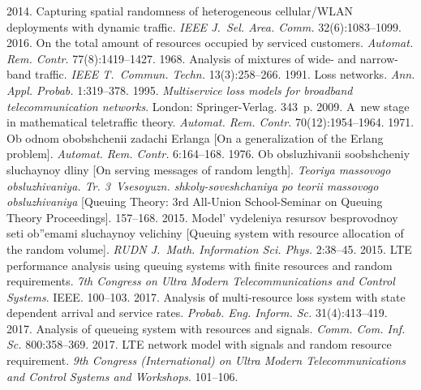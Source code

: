 \begin{multicols}{2}
{{\begin{thebibliography}{99}
 2014. Capturing spatial randomness of heterogeneous 
cellular/WLAN deployments with dynamic traffic. 
\textit{IEEE J.~Sel. Area. Comm.} 32(6):1083--1099.
 2016. 
On the total 
amount of resources occupied by serviced customers. 
\textit{Automat. Rem. Contr.} 77(8):1419--1427.
 1968. Analysis of 
mixtures of wide- and narrow-band traffic. 
\textit{IEEE T.~Commun. Techn.} 13(3):258--266.
 1991. Loss networks. \textit{Ann. Appl. Probab.} 1:319--378.
 1995. \textit{Multiservice loss models for broadband telecommunication 
networks}. London: Springer-Verlag. 343~p.
 2009. 
A~new stage in mathematical teletraffic theory. 
\textit{Automat. Rem. Contr.} 70(12):1954--1964.
 1971. Ob odnom obobshchenii zadachi Erlanga 
[On a generalization of the Erlang problem]. 
\textit{Automat. Rem. Contr.} 6:164--168.
 1976. Ob obsluzhivanii soobshcheniy sluchaynoy dliny 
[On serving messages of random length]. 
\textit{Teoriya massovogo obsluzhivaniya. Tr. 3~Vsesoyuzn. 
shkoly-soveshchaniya po teorii massovogo obsluzhivaniya} 
[Queuing Theory: 3rd All-Union School-Seminar on Queuing Theory Proceedings]. 157--168.
2015. Model' vydeleniya resursov besprovodnoy seti ob''emami sluchaynoy velichiny 
[Queuing system with resource allocation of the random volume]. 
\textit{RUDN J.~Math. 
Information Sci. Phys.} 2:38--45.
2015. LTE performance analysis using queuing systems with finite resources 
and random requirements. 
\textit{7th Congress on Ultra Modern Telecommunications and Control Systems}. 
IEEE. 100--103.
 2017. Analysis оf multi-resource loss 
system with state dependent arrival and service rates. 
\textit{Probab. Eng. Inform. Sc.} 31(4):413--419.
 2017. 
Analysis of queueing system with resources and signals. 
\textit{Comm. Com. Inf. Sc.} 800:358--369.
 2017. 
LTE network model with signals and random resource requirement. 
\textit{9th Congress (International) on Ultra Modern Telecommunications and 
Control Systems and Workshops}. 101--106.


\end{thebibliography}}}
\end{multicols}
